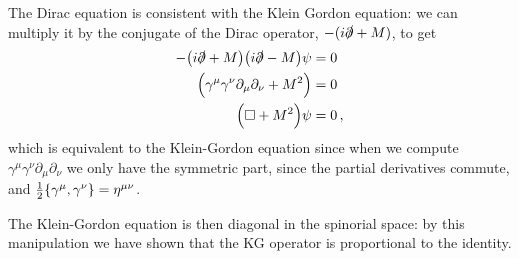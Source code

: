 \documentclass[main.tex]{subfiles}
\begin{document}
The Dirac equation is consistent with the Klein Gordon equation: we can multiply it by the conjugate of the Dirac operator, \(-(i \slashed{\partial}+M)\), to get 
%
\begin{align}
- \qty(i \slashed{\partial}+M) \qty(i \slashed{\partial}-M) \psi  &= 0\\
\qty( \gamma^{\mu } \gamma^{\nu } \partial_{\mu } \partial_{\nu } + M^2  ) &= 0   \\
\qty(\square + M^2) \psi &=0
\,,
\end{align}
%
which is equivalent to the Klein-Gordon equation since when we compute \(\gamma^{ \mu }  \gamma^{\nu } \partial_{\mu } \partial_{\nu }\) we only have the symmetric part, since the partial derivatives commute, and \(\frac{1}{2} \qty{\gamma^{\mu }, \gamma^{\nu }} = \eta^{\mu \nu }\). 

The Klein-Gordon equation is then diagonal in the spinorial space: by this manipulation we have shown that the KG operator is proportional to the identity. 
\end{document}
